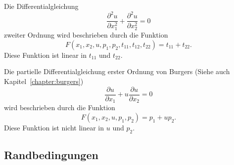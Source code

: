 \begin{beispiel}
Die Differentialgleichung
\[
\frac{\partial^2 u}{\partial x_1^2}
+
\frac{\partial^2 u}{\partial x_2^2}
=
0
\]
zweiter Ordnung wird beschrieben durch die Funktion
\[
F(x_1,x_2,u,p_1,p_2,t_{11},t_{12},t_{22})
=
t_{11} + t_{22}.
\]
Diese Funktion ist linear in $t_{11}$ und $t_{22}$.
\end{beispiel}

\begin{beispiel}
Die partielle Differentialgleichung erster Ordnung von Burgers
(Siehe auch Kapitel~\ref{chapter:burgers})
\[
\frac{\partial u}{\partial x_1}
+
u
\frac{\partial u}{\partial x_2}
=
0
\]
wird beschrieben durch die Funktion
\[
F(x_1,x_2,u,p_1,p_2)
=
p_1+up_2.
\]
Diese Funktion ist nicht linear in $u$ und $p_2$.
\end{beispiel}

\subsection{Randbedingungen
\label{subsection:pde:randbedingungen}}







